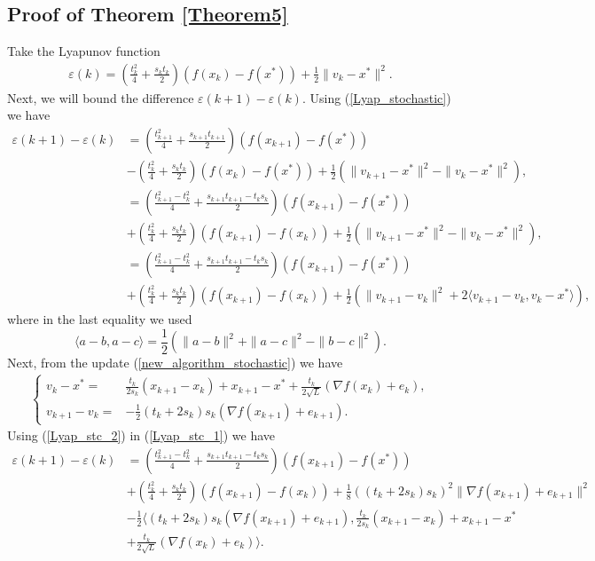 \documentclass{article}
\theoremstyle{plain}
\theoremstyle{definition}
\theoremstyle{remark}
\begin{document}
\subsection{Proof of Theorem \ref{Theorem5}}\label{thm6_proof}
Take the Lyapunov function
    \begin{align}\label{Lyap_stochastic}
    \varepsilon(k)= (\frac{t_k^2}{4}+\frac{s_kt_k}{2})(f(x_k)-f(x^*))+\frac{1}{2}\|v_k-x^*\|^2.
    \end{align}
    Next, we will bound the difference $\varepsilon(k+1)-\varepsilon(k)$. Using (\ref{Lyap_stochastic}) we have
    \begin{align}\label{Lyap_stc_1}
        \varepsilon(k+1)-\varepsilon(k)&=(\frac{t_{k+1}^2}{4}+\frac{s_{k+1}t_{k+1}}{2})(f(x_{k+1})-f(x^*))\nonumber\\
        &-(\frac{t_{k}^2}{4}+\frac{s_{k}t_{k}}{2})(f(x_{k})-f(x^*))+\frac{1}{2}(\|v_{k+1}-x^*\|^2-\|v_{k}-x^*\|^2),\nonumber\\
        & = (\frac{t_{k+1}^2-t_k^2}{4}+\frac{s_{k+1}t_{k+1}-t_ks_k}{2})(f(x_{k+1})-f(x^*))\nonumber\\
        &+(\frac{t_{k}^2}{4}+\frac{s_{k}t_{k}}{2})(f(x_{k+1})-f(x_k))+\frac{1}{2}(\|v_{k+1}-x^*\|^2-\|v_{k}-x^*\|^2),\nonumber\\
        &= (\frac{t_{k+1}^2-t_k^2}{4}+\frac{s_{k+1}t_{k+1}-t_ks_k}{2})(f(x_{k+1})-f(x^*))\nonumber\\
        &+(\frac{t_{k}^2}{4}+\frac{s_{k}t_{k}}{2})(f(x_{k+1})-f(x_k))+\frac{1}{2}(\|v_{k+1}-v_k\|^2+2\langle v_{k+1}-v_k,v_k-x^*\rangle),
    \end{align}
    where in the last equality we used 
    $$\langle a-b,a-c\rangle = \frac{1}{2}(\|a-b\|^2+\|a-c\|^2-\|b-c\|^2).$$
    Next, from the update (\ref{new_algorithm_stochastic}) we have
    \begin{align}\label{Lyap_stc_2}
        \left\{\begin{array}{cl}
             v_k-x^*=&\frac{t_k}{2s_k}(x_{k+1}-x_k)+x_{k+1}-x^*+\frac{t_k}{2\sqrt{L}}(\nabla f(x_k)+e_k),  \\
            v_{k+1}-v_k=& -\frac{1}{2}(t_k+2s_k)s_k (\nabla f(x_{k+1})+e_{k+1}).
        \end{array}\right.
    \end{align}
    Using (\ref{Lyap_stc_2}) in (\ref{Lyap_stc_1}) we have
    \begin{align}\label{Lyap_stc_3}
        \varepsilon(k+1)-\varepsilon(k)&=(\frac{t_{k+1}^2-t_k^2}{4}+\frac{s_{k+1}t_{k+1}-t_ks_k}{2})(f(x_{k+1})-f(x^*))\nonumber\\
        &+(\frac{t_{k}^2}{4}+\frac{s_{k}t_{k}}{2})(f(x_{k+1})-f(x_k))+\frac{1}{8}((t_k+2s_k)s_k)^2\|\nabla f(x_{k+1})+e_{k+1}\|^2\nonumber\\
        &-\frac{1}{2}\langle (t_k+2s_k)s_k (\nabla f(x_{k+1})+e_{k+1}), \frac{t_k}{2s_k}(x_{k+1}-x_k)+x_{k+1}-x^*\nonumber\\
        &+\frac{t_k}{2\sqrt{L}}(\nabla f(x_k)+e_k)\rangle.
    \end{align}
\end{document}
